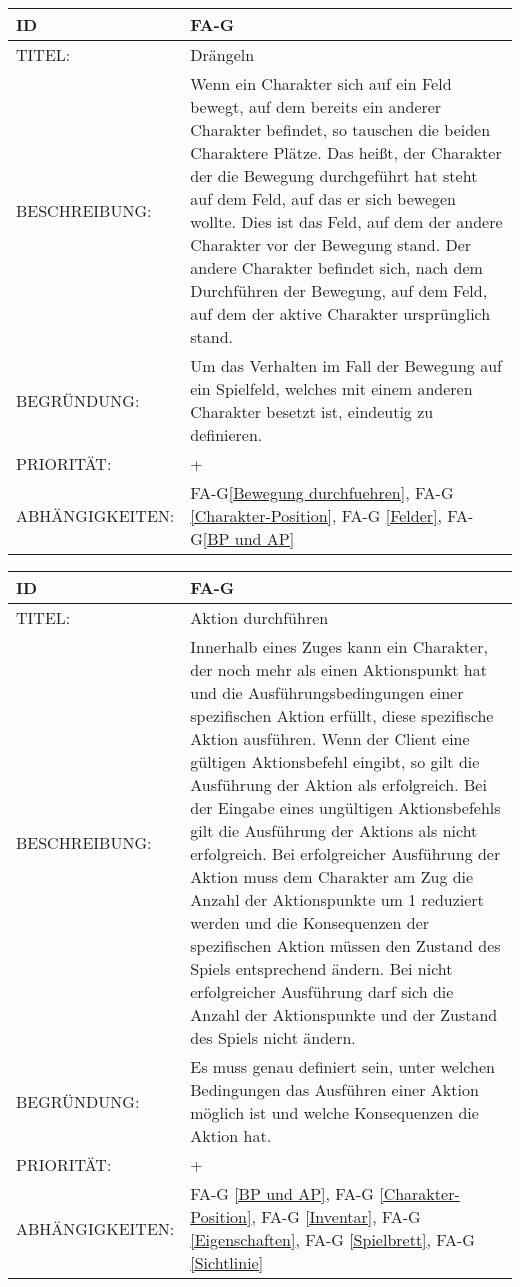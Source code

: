 \begin{tabularx}{16cm}{l|X}
	{table}\label{Draengeln}
	\textbf{ID} & \textbf{FA-G\arabic{table}} \\
	\hline
	TITEL: & Drängeln \\
	\hline
	BESCHREIBUNG: & Wenn ein Charakter sich auf ein Feld bewegt, auf dem bereits ein anderer Charakter 		befindet, so tauschen die beiden Charaktere Plätze. Das heißt, der Charakter der die Bewegung durchgeführt hat steht auf dem Feld, auf das er sich bewegen wollte. Dies ist das Feld, auf dem der andere Charakter vor der Bewegung stand. Der andere Charakter befindet sich, nach dem Durchführen der Bewegung, auf dem Feld, auf dem der aktive Charakter ursprünglich stand. \\
	\hline
	BEGRÜNDUNG: & Um das Verhalten im Fall der Bewegung auf ein Spielfeld, welches mit einem anderen 			Charakter besetzt ist, eindeutig zu definieren.\\
	\hline
	PRIORITÄT: & +\\
	\hline
	ABHÄNGIGKEITEN: & FA-G\ref{Bewegung durchfuehren}, FA-G \ref{Charakter-Position}, FA-G \ref{Felder}, FA-G\ref{BP und AP} \\
\end{tabularx}

\begin{tabularx}{16cm}{l|X}
	{table}\label{Aktion durchfuehren}
	\textbf{ID} & \textbf{FA-G\arabic{table}} \\
	\hline
	TITEL: & Aktion durchführen \\
	\hline
	BESCHREIBUNG: & Innerhalb eines Zuges kann ein Charakter, der noch mehr als einen Aktionspunkt hat und die Ausführungsbedingungen einer spezifischen Aktion erfüllt, diese spezifische Aktion ausführen.
	 Wenn der Client eine gültigen Aktionsbefehl eingibt, so gilt die Ausführung der Aktion als erfolgreich. Bei der Eingabe eines ungültigen Aktionsbefehls gilt die Ausführung der Aktions als nicht erfolgreich. 
	 Bei erfolgreicher Ausführung der Aktion muss dem Charakter am Zug die Anzahl der Aktionspunkte um 1 reduziert werden und die Konsequenzen der spezifischen Aktion müssen den Zustand des Spiels entsprechend ändern. Bei nicht erfolgreicher Ausführung darf sich die Anzahl der Aktionspunkte und der Zustand des Spiels nicht ändern. \\
	\hline
	BEGRÜNDUNG: & Es muss genau definiert sein, unter welchen Bedingungen das Ausführen einer Aktion möglich ist und welche Konsequenzen die Aktion hat.\\
	\hline
	PRIORITÄT: & +\\
	\hline
	ABHÄNGIGKEITEN: & FA-G \ref{BP und AP}, FA-G \ref{Charakter-Position}, FA-G \ref{Inventar}, FA-G \ref{Eigenschaften}, FA-G \ref{Spielbrett}, FA-G \ref{Sichtlinie} \\
\end{tabularx}


